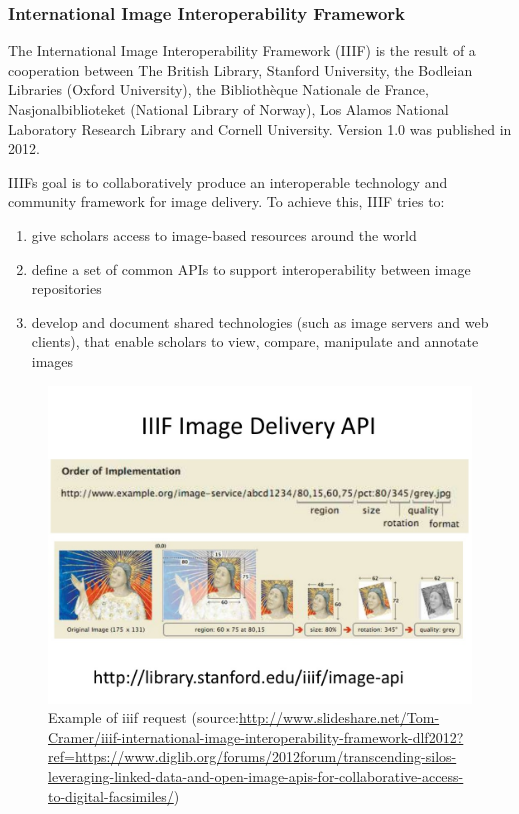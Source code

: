 \subsubsection{International Image Interoperability Framework}
The International Image Interoperability Framework (IIIF) is the result of a cooperation between The British Library, Stanford University, the Bodleian Libraries (Oxford University), the Bibliothèque Nationale de France, Nasjonalbiblioteket (National Library of Norway), Los Alamos National Laboratory Research Library and Cornell University\cite{Cramer11}. Version 1.0 was published in 2012.
\clearpage

IIIFs goal is to collaboratively produce an interoperable technology and community framework for image delivery\cite{web:iiif2}. To achieve this, IIIF tries to:
\begin{enumerate}[(1)]
	\item give scholars access to image-based resources around the world
	\item define a set of common APIs to support interoperability between image repositories
	\item develop and document shared technologies (such as image servers and web clients), that enable scholars to view, compare, manipulate and annotate images
\end{enumerate}

\begin{figure}[H]
	\begin{center}
		\includegraphics[scale=0.3]{img/iiif_url_example.jpg}
		\caption{Example of iiif request (source:\url{http://www.slideshare.net/Tom-Cramer/iiif-international-image-interoperability-framework-dlf2012?ref=https://www.diglib.org/forums/2012forum/transcending-silos-leveraging-linked-data-and-open-image-apis-for-collaborative-access-to-digital-facsimiles/})}
		\label{fig2_iiifExample}
	\end{center}
\end{figure}

